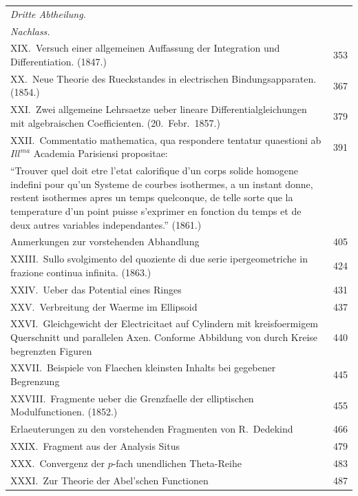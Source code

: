 \documentclass[11pt,a4paper]{article}
\theoremstyle{plain}
\theoremstyle{definition}
\begin{document}
\begin{longtable}{p{12cm}r}
\multicolumn{2}{l}{\textit{Dritte Abtheilung.}}\\
\multicolumn{2}{l}{\textit{Nachlass.}}\\[0.5em]

XIX.\ Versuch einer allgemeinen Auffassung der Integration und Differentiation. (1847.) & 353\\[0.5em]

XX.\ Neue Theorie des Rueckstandes in electrischen Bindungsapparaten. (1854.) & 367\\[0.5em]

XXI.\ Zwei allgemeine Lehrsaetze ueber lineare Differentialgleichungen mit algebraischen Coefficienten. (20.\ Febr.\ 1857.) & 379\\[0.5em]

XXII.\ Commentatio mathematica, qua respondere tentatur quaestioni ab $Ill^{ma}$ Academia Parisiensi propositae: & 391\\
\quad ``Trouver quel doit etre l'etat calorifique d'un corps solide homogene indefini pour qu'un Systeme de courbes isothermes, a un instant donne, restent isothermes apres un temps quelconque, de telle sorte que la temperature d'un point puisse s'exprimer en fonction du temps et de deux autres variables independantes.'' (1861.)\\
\quad Anmerkungen zur vorstehenden Abhandlung & 405\\[0.5em]

XXIII.\ Sullo svolgimento del quoziente di due serie ipergeometriche in frazione continua infinita. (1863.) & 424\\[0.5em]

XXIV.\ Ueber das Potential eines Ringes & 431\\[0.5em]

XXV.\ Verbreitung der Waerme im Ellipsoid & 437\\[0.5em]

XXVI.\ Gleichgewicht der Electricitaet auf Cylindern mit kreisfoermigem Querschnitt und parallelen Axen. Conforme Abbildung von durch Kreise begrenzten Figuren & 440\\[0.5em]

XXVII.\ Beispiele von Flaechen kleinsten Inhalts bei gegebener Begrenzung & 445\\[0.5em]

XXVIII.\ Fragmente ueber die Grenzfaelle der elliptischen Modulfunctionen. (1852.) & 455\\
\quad Erlaeuterungen zu den vorstehenden Fragmenten von R.\ Dedekind & 466\\[0.5em]

XXIX.\ Fragment aus der Analysis Situs & 479\\[0.5em]

XXX.\ Convergenz der $p$-fach unendlichen Theta-Reihe & 483\\[0.5em]

XXXI.\ Zur Theorie der Abel'schen Functionen & 487\\
\end{longtable}
\end{document}
